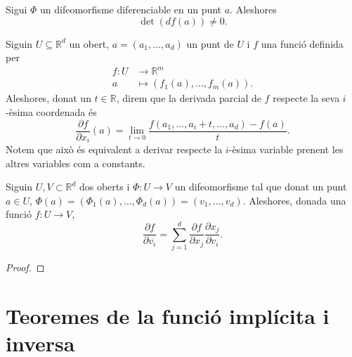 \documentclass[../Apunts.tex]{subfiles}
\begin{document}
	\begin{corollary}\label{corollary:difeomorfime determinant}
		Sigui \(\Phi\) un difeomorfisme diferenciable en un punt \(a\). Aleshores
		\[\det(df(a))\neq0.\]
	\end{corollary}
	\begin{definition}
		\label{def:Derivades parcials}
		Siguin \(U\subseteq\mathbb{R}^{d}\) un obert, \(a=(a_{1},\dots,a_{d})\) un punt de \(U\) i \(f\) una funció definida per
		\begin{align*}
		f\colon U&\longrightarrow\mathbb{R}^{m}\\
		a&\longmapsto(f_{1}(a),\dots,f_{m}(a)).
		\end{align*}
		Aleshores, donat un \(t\in\mathbb{R}\), direm que la derivada parcial de \(f\) respecte la seva \(i\)-èsima coordenada és
		\[\frac{\partial f}{\partial x_{i}}(a)=\lim_{t\to0}\frac{f(a_{1},\dots,a_{i}+t,\dots,a_{d})-f(a)}{t}.\]
		Notem que això és equivalent a derivar respecte la \(i\)-èsima variable prenent les altres variables com a constants.
	\end{definition}
	\begin{proposition}
		Siguin \(U,V\subset\mathbb{R}^{d}\) dos oberts i \(\Phi\colon U\to V\) un difeomorfisme tal que donat un punt \(a\in U\), \(\Phi(a)=(\Phi_{1}(a),\dots,\Phi_{d}(a))=(v_{1},\dots,v_{d})\). Aleshores, donada una funció \(f\colon U\to V\),\[\frac{\partial f}{\partial v_{i}}=\sum_{j=1}^{d}\frac{\partial f}{\partial x_{j}}\frac{\partial x_{j}}{\partial v_{i}}.\]		
		\begin{proof}
		\end{proof}
	\end{proposition}
	\section{Teoremes de la funció implícita i inversa}
\end{document}
